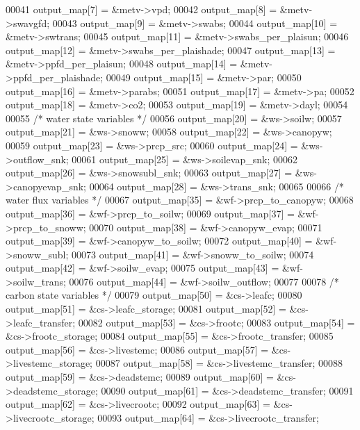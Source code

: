 \begin{DoxyCode}
00041         output\_map[7] = &metv->vpd;
00042         output\_map[8] = &metv->swavgfd;
00043         output\_map[9] = &metv->swabs;
00044         output\_map[10] = &metv->swtrans;
00045         output\_map[11] = &metv->swabs\_per\_plaisun;
00046         output\_map[12] = &metv->swabs\_per\_plaishade;
00047         output\_map[13] = &metv->ppfd\_per\_plaisun;
00048         output\_map[14] = &metv->ppfd\_per\_plaishade;
00049         output\_map[15] = &metv->par;
00050         output\_map[16] = &metv->parabs;
00051         output\_map[17] = &metv->pa;
00052         output\_map[18] = &metv->co2;
00053         output\_map[19] = &metv->dayl;
00054         
00055         \textcolor{comment}{/* water state variables */}
00056         output\_map[20] = &ws->soilw;
00057         output\_map[21] = &ws->snoww;
00058         output\_map[22] = &ws->canopyw;
00059         output\_map[23] = &ws->prcp\_src;
00060         output\_map[24] = &ws->outflow\_snk;
00061         output\_map[25] = &ws->soilevap\_snk;
00062         output\_map[26] = &ws->snowsubl\_snk;
00063         output\_map[27] = &ws->canopyevap\_snk;
00064         output\_map[28] = &ws->trans\_snk;
00065         
00066         \textcolor{comment}{/* water flux variables */}
00067         output\_map[35] = &wf->prcp\_to\_canopyw;
00068         output\_map[36] = &wf->prcp\_to\_soilw;
00069         output\_map[37] = &wf->prcp\_to\_snoww;
00070         output\_map[38] = &wf->canopyw\_evap;
00071         output\_map[39] = &wf->canopyw\_to\_soilw;
00072         output\_map[40] = &wf->snoww\_subl;
00073         output\_map[41] = &wf->snoww\_to\_soilw;
00074         output\_map[42] = &wf->soilw\_evap;
00075         output\_map[43] = &wf->soilw\_trans;
00076         output\_map[44] = &wf->soilw\_outflow;
00077         
00078         \textcolor{comment}{/* carbon state variables */}
00079         output\_map[50] = &cs->leafc;
00080         output\_map[51] = &cs->leafc\_storage;
00081         output\_map[52] = &cs->leafc\_transfer;
00082         output\_map[53] = &cs->frootc;
00083         output\_map[54] = &cs->frootc\_storage;
00084         output\_map[55] = &cs->frootc\_transfer;
00085         output\_map[56] = &cs->livestemc;
00086         output\_map[57] = &cs->livestemc\_storage;
00087         output\_map[58] = &cs->livestemc\_transfer;
00088         output\_map[59] = &cs->deadstemc;
00089         output\_map[60] = &cs->deadstemc\_storage;
00090         output\_map[61] = &cs->deadstemc\_transfer;
00091         output\_map[62] = &cs->livecrootc;
00092         output\_map[63] = &cs->livecrootc\_storage;
00093         output\_map[64] = &cs->livecrootc\_transfer;

\end{DoxyCode}
